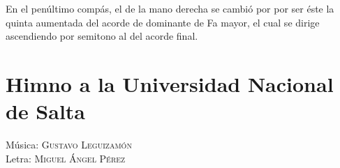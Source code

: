 En el penúltimo compás, el  de la mano derecha se cambió por  por ser éste la quinta aumentada del acorde de dominante de Fa mayor, el cual se dirige ascendiendo por semitono al  del acorde final.


\newpage
\section{Himno a la Universidad Nacional de Salta}\label{partitura-digitalizada}

\begin{flushright}
Música: \textsc{Gustavo Leguizamón}\\
Letra: \textsc{Miguel Ángel Pérez}
\end{flushright}

